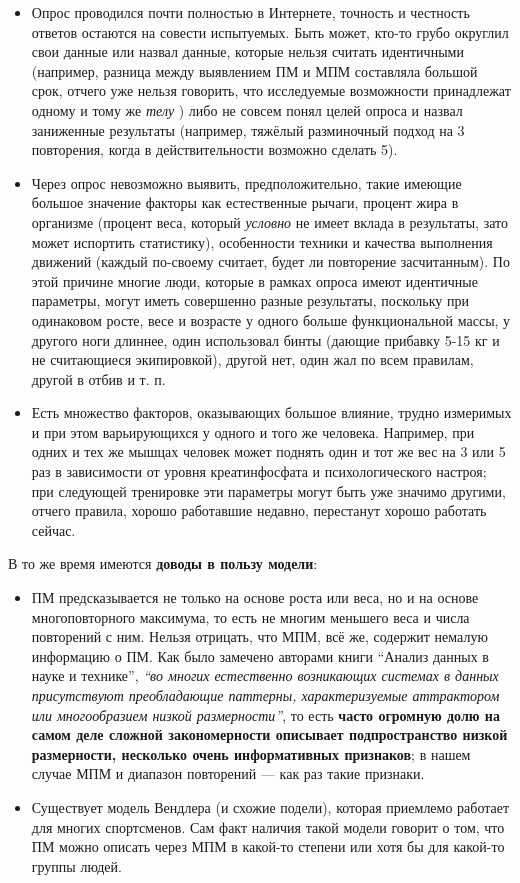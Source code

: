 \documentclass[
]{article}
\begin{document}
\begin{itemize}
\item
  Опрос проводился почти полностью в Интернете, точность и честность
  ответов остаются на совести испытуемых. Быть может, кто-то грубо
  округлил свои данные или назвал данные, которые нельзя считать
  идентичными (например, разница между выявлением ПМ и МПМ составляла
  большой срок, отчего уже нельзя говорить, что исследуемые возможности
  принадлежат одному и тому же \emph{телу} ) либо не совсем понял целей
  опроса и назвал заниженные результаты (например, тяжёлый разминочный
  подход на 3 повторения, когда в действительности возможно сделать 5).
\item
  Через опрос невозможно выявить, предположительно, такие имеющие
  большое значение факторы как естественные рычаги, процент жира в
  организме (процент веса, который \emph{условно} не имеет вклада в
  результаты, зато может испортить статистику), особенности техники и
  качества выполнения движений (каждый по-своему считает, будет ли
  повторение засчитанным). По этой причине многие люди, которые в рамках
  опроса имеют идентичные параметры, могут иметь совершенно разные
  результаты, поскольку при одинаковом росте, весе и возрасте у одного
  больше функциональной массы, у другого ноги длиннее, один использовал
  бинты (дающие прибавку 5-15 кг и не считающиеся экипировкой), другой
  нет, один жал по всем правилам, другой в отбив и т. п.
\item
  Есть множество факторов, оказывающих большое влияние, трудно измеримых
  и при этом варьирующихся у одного и того же человека. Например, при
  одних и тех же мышцах человек может поднять один и тот же вес на 3 или
  5 раз в зависимости от уровня креатинфосфата и психологического
  настроя; при следующей тренировке эти параметры могут быть уже значимо
  другими, отчего правила, хорошо работавшие недавно, перестанут хорошо
  работать сейчас.
\end{itemize}

В то же время имеются \textbf{доводы в пользу модели}:

\begin{itemize}
\item
  ПМ предсказывается не только на основе роста или веса, но и на основе
  многоповторного максимума, то есть не многим меньшего веса и числа
  повторений с ним. Нельзя отрицать, что МПМ, всё же, содержит немалую
  информацию о ПМ. Как было замечено авторами книги ``Анализ данных в
  науке и технике'', \emph{``во многих естественно возникающих системах
  в данных присутствуют преобладающие паттерны, характеризуемые
  аттрактором или многообразием низкой размерности''}, то есть
  \textbf{часто огромную долю на самом деле сложной закономерности
  описывает подпространство низкой размерности, несколько очень
  информативных признаков}; в нашем случае МПМ и диапазон повторений ---
  как раз такие признаки.
\item
  Существует модель Вендлера (и схожие подели), которая приемлемо
  работает для многих спортсменов. Сам факт наличия такой модели говорит
  о том, что ПМ можно описать через МПМ в какой-то степени или хотя бы
  для какой-то группы людей.
\end{itemize}
\end{document}
